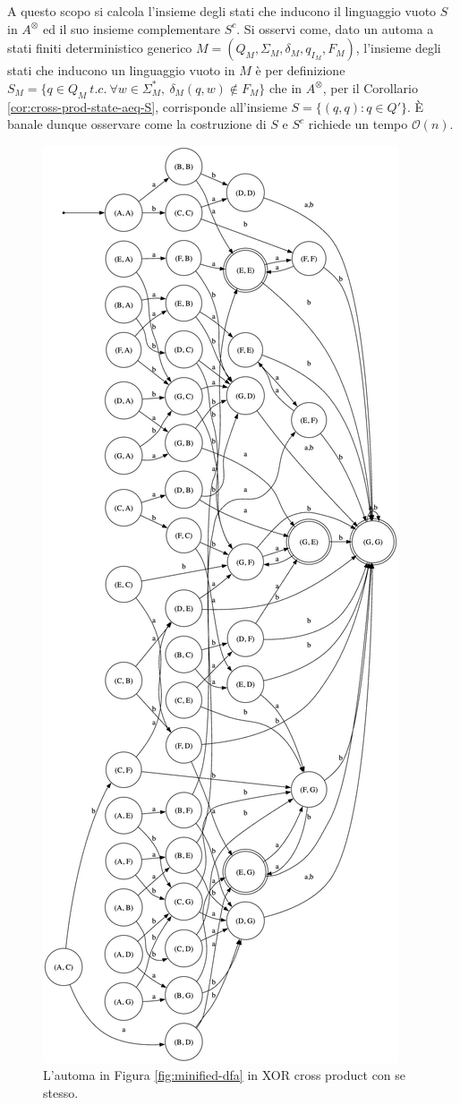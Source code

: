 \documentclass[a4paper,12pt,twoside, openright]{report} %
\newcommand{\bigo}[0]{\mathcal{O}}            %
\begin{document}
A questo scopo si calcola l'insieme degli stati che inducono il linguaggio vuoto $S$ in $A^\otimes$ ed il suo 
insieme complementare $S^c$. Si osservi come, dato un automa a stati finiti deterministico generico 
$M = (Q_M, \Sigma_M, \delta_M, q_{I_M}, F_M)$, l'insieme degli stati che inducono un linguaggio vuoto in $M$
è per definizione $S_M = \{q \in Q_M \ t.c. \ \forall w \in \Sigma^*_M, \ \delta_M(q, w) \notin F_M\}$ che in
$A^\otimes$, per il Corollario \ref{cor:cross-prod-state-aeq-S}, corrisponde all'insieme $S = \{ (q, q) : q \in Q' \}$. 
È banale dunque osservare come la costruzione di $S$ e $S^c$ richiede un tempo $\bigo(n)$.

\begin{figure}
  \centering
  \includegraphics[width=0.5\linewidth]{images/dfa_xcp.png}
  \caption{\label{fig:dfa-xcp}L'automa in Figura \ref{fig:minified-dfa} in XOR cross product con se stesso.}
\end{figure}
\end{document}
